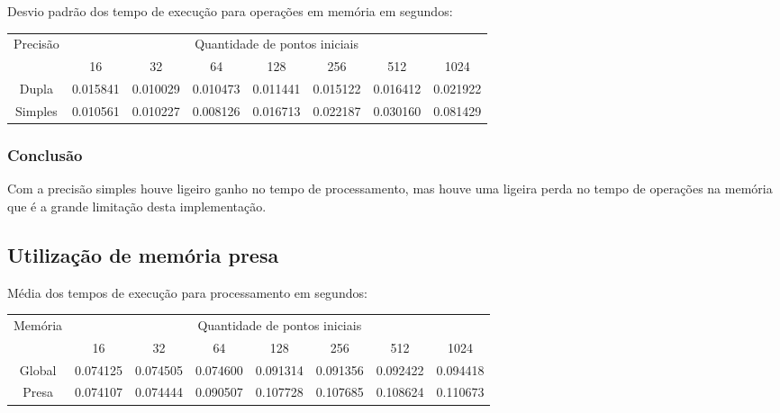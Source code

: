   \hspace{1mm}\newline
  
  \noindent Desvio padrão dos tempo de execução para operações em memória em segundos:\\
  \begin{tabular}{| c | c | c | c | c | c | c | c |}
    \hline
    \multirow{2}{*}{Precisão}& \multicolumn{7}{|c|}{Quantidade de pontos iniciais} \\ \cline{2-8}
    & 16 & 32 & 64 & 128 & 256 & 512 & 1024\\ \hline
    Dupla & 0.015841 & 0.010029 & 0.010473 & 0.011441 & 0.015122 & 0.016412 & 0.021922\\ \hline
    Simples & 0.010561 & 0.010227 & 0.008126 & 0.016713 & 0.022187 & 0.030160 & 0.081429\\ \hline
  \end{tabular}
  
    \subsubsection{Conclusão}
    Com a precisão simples houve ligeiro ganho no tempo de processamento, mas houve uma ligeira perda no tempo de operações na memória que é a grande limitação desta implementação.
  
  \subsection{Utilização de memória presa}
  \begin{small}
  Média dos tempos de execução para processamento em segundos:\\
  \begin{tabular}{| c | c | c | c | c | c | c | c |}
    \hline
    \multirow{2}{*}{Memória}& \multicolumn{7}{|c|}{Quantidade de pontos iniciais} \\ \cline{2-8}
    & 16 & 32 & 64 & 128 & 256 & 512 & 1024 \\ \hline
    Global & 0.074125 & 0.074505 & 0.074600 & 0.091314 & 0.091356 & 0.092422 & 0.094418\\ \hline
    Presa & 0.074107 & 0.074444 & 0.090507 & 0.107728 & 0.107685 & 0.108624 & 0.110673\\ \hline

    \hline
  \end{tabular}
  \end{small}  
  \hspace{1mm}\newline
  
